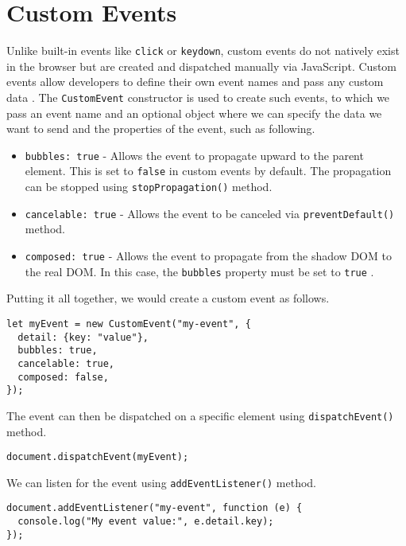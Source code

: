 \section{Custom Events}
Unlike built-in events like \texttt{click} or \texttt{keydown}, custom events do not natively exist in the browser but are created and dispatched manually via JavaScript. Custom events allow developers to define their own event names and pass any custom data \cite{MDNCustomEvent}. The \texttt{CustomEvent} constructor is used to create such events, to which we pass an event name and an optional object where we can specify the data we want to send and the properties of the event, such as following.
\begin{itemize}
    \item \texttt{bubbles: true} - Allows the event to propagate upward to the parent element. This is set to \texttt{false} in custom events by default. The propagation can be stopped using \texttt{stopPropagation()} method.
    \item \texttt{cancelable: true} - Allows the event to be canceled via \texttt{preventDefault()} method.
    \item \texttt{composed: true} - Allows the event to propagate from the shadow DOM to the real DOM. In this case, the \texttt{bubbles} property must be set to \texttt{true} \cite{JamesCustomEvent}.
\end{itemize}
Putting it all together, we would create a custom event as follows.
\begin{verbatim}
let myEvent = new CustomEvent("my-event", {
  detail: {key: "value"},
  bubbles: true,
  cancelable: true,
  composed: false,
});
\end{verbatim}
The event can then be dispatched on a specific element using \texttt{dispatchEvent()} method.
\begin{verbatim}
document.dispatchEvent(myEvent);
\end{verbatim}
We can listen for the event using \texttt{addEventListener()} method.
\begin{verbatim}
document.addEventListener("my-event", function (e) {
  console.log("My event value:", e.detail.key);
});
\end{verbatim}
